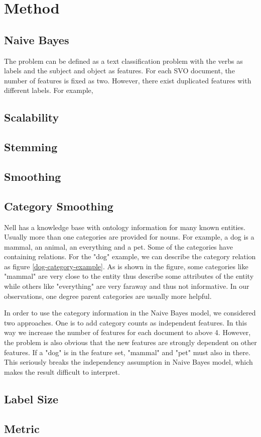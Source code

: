 \section{Method}

\subsection{Naive Bayes}

The problem can be defined as a text classification problem with the verbs as labels and the subject and object as features. For each SVO document, the number of features is fixed as two. However, there exist duplicated features with different labels. For example, 


\subsection{Scalability}


\subsection{Stemming}

\subsection{Smoothing}

\subsection{Category Smoothing}

Nell has a knowledge base with ontology information for many known entities. Usually more than one categories are provided for nouns. For example, a dog is a mammal, an animal, an everything and a pet. Some of the categories have containing relations. For the "dog" example, we can describe the category relation as figure \ref{dog-category-example}. As is shown in the figure, some categories like "mammal" are very close to the entity thus describe some attributes of the entity while others like "everything" are very faraway and thus not informative. In our observations, one degree parent categories are usually more helpful.


In order to use the category information in the Naive Bayes model, we considered two approaches. One is to add category counts as independent features. In this way we increase the number of features for each document to above 4. However, the problem is also obvious that the new features are strongly dependent on other features. If a "dog" is in the feature set, "mammal" and "pet" must also in there. This seriously breaks the independency assumption in Naive Bayes model, which makes the result difficult to interpret.


\subsection{Label Size}

\subsection{Metric}
